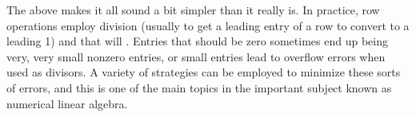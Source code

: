\documentclass{ximera}
\begin{document}
The above makes it all sound a bit simpler than it really is.  In practice, row operations employ division (usually to get a leading entry of a row to convert to a leading 1) and that will .  Entries that should be zero sometimes end up being very, very small nonzero entries, or small entries lead to overflow errors when used as divisors.  A variety of strategies can be employed to minimize these sorts of errors, and this is one of the main topics in the important subject known as numerical linear algebra.
\end{document}
